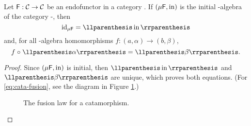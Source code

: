 \begin{lemma}
  \label{lem:cata-refl-fusion}


  Let $\mathsf{F}: \mathcal{C} \to \mathcal{C}$ be an endofunctor in a category
  . If $(\mu\mathsf{F},\operatorname{in})$ is the initial -algebra of
  the category -\alg, then
  \begin{equation}
    \label{eq:cata-refl}
    \idO{\mu\func{F}} = \cata\inmo
  \end{equation}
  and, for all -algebra homomorphisms $f: (a,\alpha) \to
  (b,\beta)$,
  \begin{equation}
    \label{eq:cata-fusion}
    f \comp \cata\alpha = \cata\beta
    \text{.}
  \end{equation}

  \begin{proof}

    Since $(\mu\mathsf{F},\operatorname{in})$ is initial, then $\cata\inmo$ and
    $\cata\beta$ are unique, which proves both equations. (For
    \eqref{eq:cata-fusion}, see the diagram in Figure
    \ref{fig:cata-fusion}.)

    \begin{figure}[htb]
      \begin{center}
      \end{center}
      \caption{The fusion law for a catamorphism.}
      \label{fig:cata-fusion}
    \end{figure}

  \end{proof}

\end{lemma}

